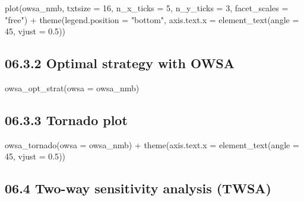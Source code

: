 \documentclass[
]{article}
\newenvironment{Shaded}{\begin{snugshade}}{\end{snugshade}}
\newcommand{\AttributeTok}[1]{\textcolor[rgb]{0.77,0.63,0.00}{#1}}
\newcommand{\DecValTok}[1]{\textcolor[rgb]{0.00,0.00,0.81}{#1}}
\newcommand{\FloatTok}[1]{\textcolor[rgb]{0.00,0.00,0.81}{#1}}
\newcommand{\FunctionTok}[1]{\textcolor[rgb]{0.00,0.00,0.00}{#1}}
\newcommand{\NormalTok}[1]{#1}
\newcommand{\SpecialCharTok}[1]{\textcolor[rgb]{0.00,0.00,0.00}{#1}}
\newcommand{\StringTok}[1]{\textcolor[rgb]{0.31,0.60,0.02}{#1}}
\begin{document}
\begin{Shaded}
\begin{Highlighting}[]
\FunctionTok{plot}\NormalTok{(owsa\_nmb, }\AttributeTok{txtsize =} \DecValTok{16}\NormalTok{, }\AttributeTok{n\_x\_ticks =} \DecValTok{5}\NormalTok{, }\AttributeTok{n\_y\_ticks =} \DecValTok{3}\NormalTok{,}
     \AttributeTok{facet\_scales =} \StringTok{"free"}\NormalTok{) }\SpecialCharTok{+}
     \FunctionTok{theme}\NormalTok{(}\AttributeTok{legend.position =} \StringTok{"bottom"}\NormalTok{, }
           \AttributeTok{axis.text.x =} \FunctionTok{element\_text}\NormalTok{(}\AttributeTok{angle =} \DecValTok{45}\NormalTok{, }\AttributeTok{vjust =} \FloatTok{0.5}\NormalTok{))}
\end{Highlighting}
\end{Shaded}

\hypertarget{optimal-strategy-with-owsa}{%
\subsection{06.3.2 Optimal strategy with
OWSA}\label{optimal-strategy-with-owsa}}

\begin{Shaded}
\begin{Highlighting}[]
\FunctionTok{owsa\_opt\_strat}\NormalTok{(}\AttributeTok{owsa =}\NormalTok{ owsa\_nmb)}
\end{Highlighting}
\end{Shaded}

\hypertarget{tornado-plot}{%
\subsection{06.3.3 Tornado plot}\label{tornado-plot}}

\begin{Shaded}
\begin{Highlighting}[]
\FunctionTok{owsa\_tornado}\NormalTok{(}\AttributeTok{owsa =}\NormalTok{ owsa\_nmb) }\SpecialCharTok{+}
  \FunctionTok{theme}\NormalTok{(}\AttributeTok{axis.text.x =} \FunctionTok{element\_text}\NormalTok{(}\AttributeTok{angle =} \DecValTok{45}\NormalTok{, }\AttributeTok{vjust =} \FloatTok{0.5}\NormalTok{))}
\end{Highlighting}
\end{Shaded}

\hypertarget{two-way-sensitivity-analysis-twsa}{%
\subsection{06.4 Two-way sensitivity analysis
(TWSA)}\label{two-way-sensitivity-analysis-twsa}}
\end{document}
